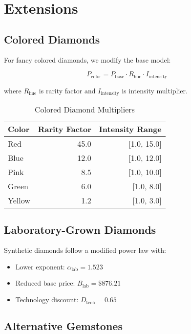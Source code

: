 \documentclass[12pt,a4paper]{article}
\begin{document}
\section{Extensions}
\label{sec:extensions}

\subsection{Colored Diamonds}

For fancy colored diamonds, we modify the base model:

\begin{equation}
P_{\text{color}} = P_{\text{base}} \cdot R_{\text{hue}} \cdot I_{\text{intensity}}
\end{equation}

where $R_{\text{hue}}$ is rarity factor and $I_{\text{intensity}}$ is intensity multiplier.

\begin{table}[H]
\centering
\caption{Colored Diamond Multipliers}
\begin{tabular}{lrr}
\toprule
\textbf{Color} & \textbf{Rarity Factor} & \textbf{Intensity Range} \\
\midrule
Red & 45.0 & [1.0, 15.0] \\
Blue & 12.0 & [1.0, 12.0] \\
Pink & 8.5 & [1.0, 10.0] \\
Green & 6.0 & [1.0, 8.0] \\
Yellow & 1.2 & [1.0, 3.0] \\
\bottomrule
\end{tabular}
\end{table}

\subsection{Laboratory-Grown Diamonds}

Synthetic diamonds follow a modified power law with:
\begin{itemize}
    \item Lower exponent: $\alpha_{\text{lab}} = 1.523$
    \item Reduced base price: $B_{\text{lab}} = \$876.21$
    \item Technology discount: $D_{\text{tech}} = 0.65$
\end{itemize}

\subsection{Alternative Gemstones}
\end{document}
